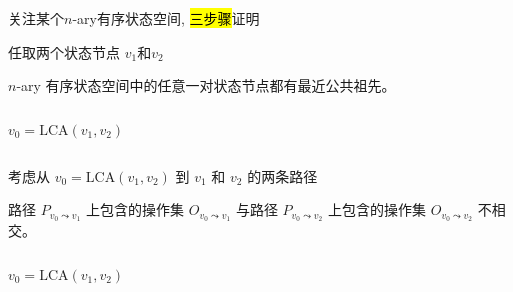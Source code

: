 \begin{frame}{}
  \centerline{}
\end{frame}

\begin{frame}{}
  \begin{center}
    {\large 关注某个$n$-ary有序状态空间, \hl{三步骤}证明}
  \end{center}


  \pause
  \begin{center}
  \end{center}
\end{frame}

\begin{frame}{}
  \centerline{ 任取两个状态节点 $v_1$和$v_2$}

  \begin{clemma}
    $n$-ary 有序状态空间中的任意一对状态节点都有最近公共祖先。
  \end{clemma}

  \begin{columns}
	\[
	  v_0 = \text{LCA}(v_1, v_2)
	\]
  \end{columns}
\end{frame}

\begin{frame}{}
  \centerline{ 考虑从 $v_0 = \text{LCA}(v_1, v_2)$ 到 $v_1$ 和 $v_2$ 的两条路径}

  \begin{clemma}
    路径 $P_{v_0 \leadsto v_1}$ 上包含的操作集 $O_{v_0 \leadsto v_1}$ 与路径 $P_{v_0 \leadsto v_2}$ 上包含的操作集
    $O_{v_0 \leadsto v_2}$ 不相交。
  \end{clemma}

  \begin{columns}
	\[
	  v_0 = \text{LCA}(v_1, v_2)
	\]
  \end{columns}
\end{frame}

